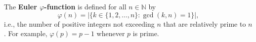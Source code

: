 The \textbf{Euler $\varphi$-function} is defined for all $n \in \mathbb{N}$ by
$$\varphi(n) = |\{k \in \{1, 2, \ldots, n\} : \gcd(k, n) = 1\}|,$$
i.e., the number of positive integers not exceeding $n$ that are relatively prime to $n$. For example, $\varphi(p) = p - 1$ whenever $p$ is prime.
